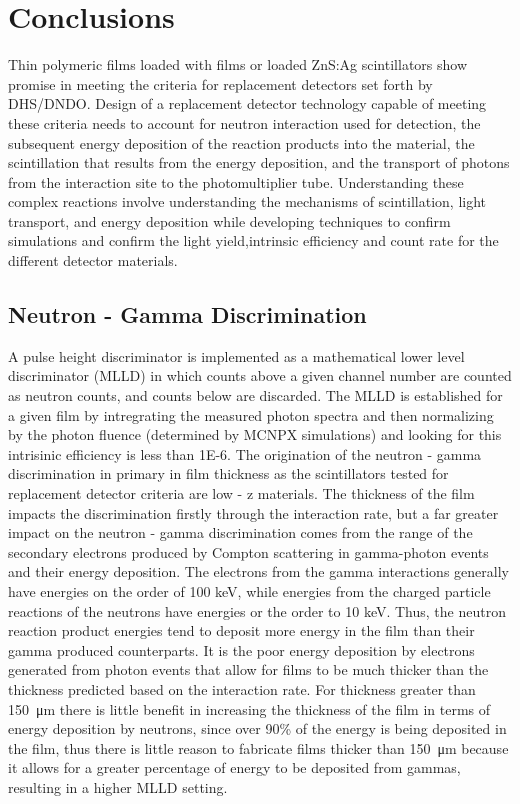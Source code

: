\chapter{Conclusions}
\label{chap:Conclusions}
Thin polymeric films loaded with  films or  loaded ZnS:Ag scintillators show promise in meeting the criteria for replacement detectors set forth by DHS/DNDO.
Design of a replacement detector technology capable of meeting these criteria needs to account for neutron interaction used for detection, the subsequent energy deposition  of the reaction products into the material, the scintillation that results from the energy deposition, and the transport of photons from the interaction site to the photomultiplier tube.
Understanding these complex reactions involve understanding the mechanisms of scintillation, light transport, and energy deposition while developing techniques to confirm simulations and confirm the light yield,intrinsic efficiency and count rate for the different detector materials.

\section{Neutron - Gamma Discrimination}
A pulse height discriminator is implemented as a mathematical lower level discriminator (MLLD) in which counts above a given channel number are counted as neutron counts, and counts below are discarded.
The MLLD is established for a given film by intregrating the measured photon spectra and then normalizing by the photon fluence (determined by MCNPX simulations) and looking for this intrisinic efficiency is less than \num{1E-6}.
The origination of the neutron - gamma discrimination in primary in film thickness as the scintillators tested for replacement detector criteria are low - z materials.
The thickness of the film impacts the discrimination firstly through the interaction rate, but a far greater impact on the neutron - gamma discrimination comes from the range of the secondary electrons produced by Compton scattering in gamma-photon events and their energy deposition.
The electrons from the gamma interactions generally have energies on the order of 100 keV, while energies from the charged particle reactions of the neutrons have energies or the order to 10 keV.
Thus, the neutron reaction product energies tend to deposit more energy in the film than their gamma produced counterparts.
It is the poor energy deposition by electrons generated from photon events that allow for films to be much thicker than the thickness predicted based on the interaction rate.
For thickness greater than \SI{150}{\um} there is little benefit in increasing the thickness of the film in terms of energy deposition by neutrons, since over 90\% of the energy is being deposited in the film, thus there is little reason to fabricate films thicker than \SI{150}{\um} because it allows for a greater percentage of energy to be deposited from gammas, resulting in a higher MLLD setting.

